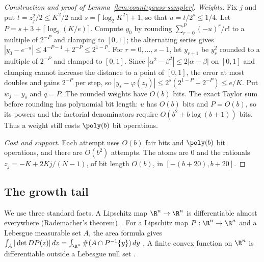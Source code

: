 \begin{proof}[Construction and proof of Lemma~\ref{lem:count:gauss-sampler}]
\emph{Weights.} Fix $j$ and put $t=z_j^2/2\le K^2/2$ and
$s=\lceil\log_2K^2\rceil+1$, so that $u=t/2^s\le1/4$. Let $P=s+3+\lceil\log_2(K/e)\rceil$.
Compute $y_0$ by rounding $\sum_{r=0}^{P}(-u)^r/r!$ to a multiple of $2^{-P}$
and clamping to $[0,1]$; the alternating series gives
$|y_0-e^{-u}|\le4^{-P-1}+2^{-P}\le2^{1-P}$. For
$r=0,\dots,s-1$, let $y_{r+1}$ be $y_r^2$ rounded to a multiple of $2^{-P}$
and clamped to $[0,1]$. Since $|\alpha^2-\beta^2|\le2|\alpha-\beta|$ on $[0,1]$
and clamping cannot increase the distance to a point of $[0,1]$, the error at
most doubles and gains $2^{-P}$ per step, so
$|y_s-\varphi(z_j)|\le2^s(2^{1-P}+2^{-P})\le e/K$. Put $w_j=y_s$ and $q=P$.
The rounded weights have $O(b)$ bits. The exact Taylor sum before rounding
has polynomial bit length: $u$ has $O(b)$ bits and $P=O(b)$, so its powers
and the factorial denominators require $O(b^2+b\log(b+1))$ bits. Thus a
weight still costs $\poly(b)$ bit operations.

\emph{Cost and support.} Each attempt uses $O(b)$ fair bits and $\poly(b)$ bit
operations, and there are $O(b^2)$ attempts. The atoms are $0$ and the
rationals $z_j=-K+2Kj/(N-1)$, of bit length $O(b)$, in $[-(b+20),b+20]$.
\end{proof}

\subsection{The growth tail}

We use three standard facts. A Lipschitz map $\R^n\to\R^n$ is differentiable
almost everywhere (Rademacher's theorem)~\citep{evans2015-measure-theory-and-fine}. For a Lipschitz map
$P:\R^n\to\R^n$ and a Lebesgue measurable set $A$, the area formula gives
$\int_A|\det DP(z)|\,dz=\int_{\R^n}\#(A\cap P^{-1}\{y\})\,dy$
\cite{evans2015-measure-theory-and-fine,federer1969-geometric-measure-theory}.
A finite convex function on $\R^n$ is differentiable outside a Lebesgue null
set \cite{rockafellar1970-convex-analysis}.

